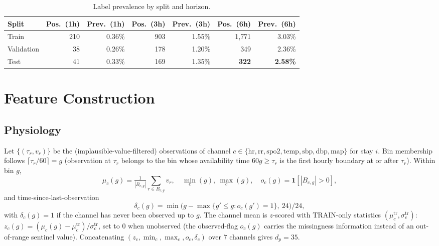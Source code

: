 \documentclass[11pt]{article}
\newcommand{\1}[1]{\mathbf{1}\!\left[#1\right]}
\begin{document}
\begin{table}[h]
\centering
\caption{Label prevalence by split and horizon.}
\label{tab:prevalence}
\begin{tabular}{lrrrrrr}
\toprule
Split & Pos.\ (1h) & Prev.\ (1h) & Pos.\ (3h) & Prev.\ (3h) & Pos.\ (6h) & Prev.\ (6h) \\
\midrule
Train & 210 & 0.36\% & 903 & 1.55\% & 1{,}771 & 3.03\% \\
Validation & 38 & 0.26\% & 178 & 1.20\% & 349 & 2.36\% \\
Test & 41 & 0.33\% & 169 & 1.35\% & \textbf{322} & \textbf{2.58\%} \\
\bottomrule
\end{tabular}
\end{table}

\section{Feature Construction}\label{sec:features}

\subsection{Physiology}

Let $\{(\tau_r, v_r)\}$ be the (implausible-value-filtered) observations of channel $c\in\{\mathrm{hr,rr,spo2,temp,sbp,dbp,map}\}$ for stay $i$. Bin membership follows $\lceil \tau_r/60 \rceil = g$ (observation at $\tau_r$ belongs to the bin whose availability time $60g \ge \tau_r$ is the first hourly boundary at or after $\tau_r$). Within bin $g$,
\begin{equation}
\mu_c(g) = \tfrac{1}{|B_{c,g}|}\!\!\sum_{r\in B_{c,g}}\!\! v_r,\quad
\min_c(g),\ \max_c(g),\quad
o_c(g) = \1{|B_{c,g}|>0},
\end{equation}
and time-since-last-observation
\begin{equation}
\delta_c(g) = \min\!\Big(g - \max\{g' \le g : o_c(g')=1\},\ 24\Big)\big/24,
\end{equation}
with $\delta_c(g)=1$ if the channel has never been observed up to $g$. The channel mean is $z$-scored with $\mathrm{TRAIN}$-only statistics $(\mu_c^{\mathrm{tr}}, \sigma_c^{\mathrm{tr}})$: $z_c(g) = (\mu_c(g)-\mu_c^{\mathrm{tr}})/\sigma_c^{\mathrm{tr}}$, set to $0$ when unobserved (the observed-flag $o_c(g)$ carries the missingness information instead of an out-of-range sentinel value). Concatenating $(z_c,\min_c,\max_c,o_c,\delta_c)$ over $7$ channels gives $d_p = 35$.
\end{document}
